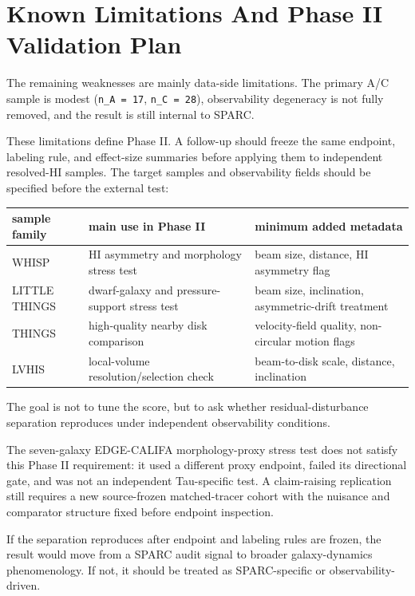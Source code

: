 \documentclass[11pt]{article}
\begin{document}
\section{Known Limitations And Phase II Validation Plan}
The remaining weaknesses are mainly data-side limitations. The primary A/C sample is modest (\texttt{n\_A = 17}, \texttt{n\_C = 28}), observability degeneracy is not fully removed, and the result is still internal to SPARC.

These limitations define Phase II. A follow-up should freeze the same endpoint, labeling rule, and effect-size summaries before applying them to independent resolved-HI samples. The target samples and observability fields should be specified before the external test:

\begin{table}[htbp]
\centering
\footnotesize
\setlength{\tabcolsep}{3pt}
\begin{tabularx}{\linewidth}{Y Y Y}
\toprule
sample family & main use in Phase II & minimum added metadata \\
\midrule
WHISP & HI asymmetry and morphology stress test & beam size, distance, HI asymmetry flag \\
LITTLE THINGS & dwarf-galaxy and pressure-support stress test & beam size, inclination, asymmetric-drift treatment \\
THINGS & high-quality nearby disk comparison & velocity-field quality, non-circular motion flags \\
LVHIS & local-volume resolution/selection check & beam-to-disk scale, distance, inclination \\
\bottomrule
\end{tabularx}
\end{table}
The goal is not to tune the score, but to ask whether residual-disturbance separation reproduces under independent observability conditions.

The seven-galaxy EDGE-CALIFA morphology-proxy stress test does not satisfy this Phase II requirement: it used a different proxy endpoint, failed its directional gate, and was not an independent Tau-specific test. A claim-raising replication still requires a new source-frozen matched-tracer cohort with the nuisance and comparator structure fixed before endpoint inspection.

If the separation reproduces after endpoint and labeling rules are frozen, the result would move from a SPARC audit signal to broader galaxy-dynamics phenomenology. If not, it should be treated as SPARC-specific or observability-driven.
\end{document}
